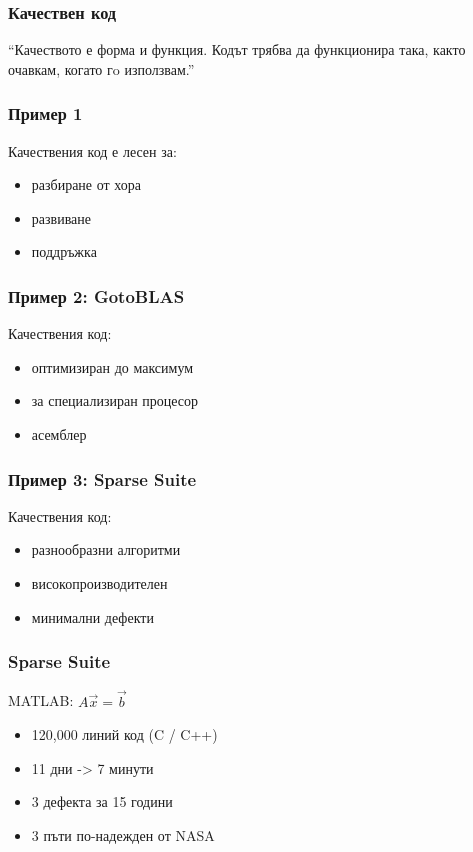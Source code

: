\begin{frame}
  \frametitle{Качествен код}

\begin{exampleblock}{}
  {\large ``Качеството е форма и функция.  Кодът трябва да функционира така, както очавкам, когато гo използвам.''}
\end{exampleblock}
\end{frame}


\begin{frame}
  \frametitle{Пример 1}
  Качествения код е лесен за:
  \begin{itemize}
  \item разбиране от хора
  \item развиване
  \item поддръжка
  \end{itemize}
\end{frame}


\begin{frame}
  \frametitle{Пример 2: GotoBLAS}
  Качествения код:
  \begin{itemize}
  \item оптимизиран до максимум
  \item за специализиран процесор
  \item асемблер
  \end{itemize}
\end{frame}


\begin{frame}
  \frametitle{Пример 3: Sparse Suite}
  Качествения код:
  \begin{itemize}
  \item разнообразни алгоритми
  \item високопроизводителен
  \item минимални дефекти
  \end{itemize}
\end{frame}


\begin{frame}
  \frametitle{Sparse Suite}
  MATLAB: $A \vec{x} = \vec{b}$ 
  \begin{itemize}
  \item 120,000 линий код (C / C++) 
  \item 11 дни -> 7 минути
  \item 3 дефекта за 15 години
  \item 3 пъти по-надежден от NASA
  \end{itemize}
\end{frame}
